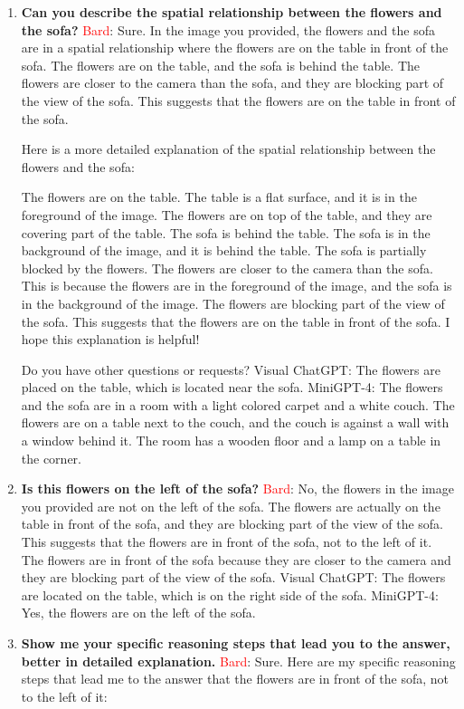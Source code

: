 \begin{enumerate}
    \item \textbf{Can you describe the spatial relationship between the flowers and the sofa?}
    \subitem \textcolor{Red}{Bard}: 
    Sure. In the image you provided, the flowers and the sofa are in a spatial relationship where the flowers are on the table in front of the sofa. The flowers are on the table, and the sofa is behind the table. The flowers are closer to the camera than the sofa, and they are blocking part of the view of the sofa. This suggests that the flowers are on the table in front of the sofa.
    
    Here is a more detailed explanation of the spatial relationship between the flowers and the sofa:
    
    The flowers are on the table. The table is a flat surface, and it is in the foreground of the image. The flowers are on top of the table, and they are covering part of the table.
    The sofa is behind the table. The sofa is in the background of the image, and it is behind the table. The sofa is partially blocked by the flowers.
    The flowers are closer to the camera than the sofa. This is because the flowers are in the foreground of the image, and the sofa is in the background of the image.
    The flowers are blocking part of the view of the sofa. This suggests that the flowers are on the table in front of the sofa.
    I hope this explanation is helpful!
    
    Do you have other questions or requests?
    \subitem Visual ChatGPT: The flowers are placed on the table, which is located near the sofa.
    \subitem MiniGPT-4: The flowers and the sofa are in a room with a light colored carpet and a white couch. The flowers are on a table next to the couch, and the couch is against a wall with a window behind it. The room has a wooden floor and a lamp on a table in the corner.
    \item \textbf{Is this flowers on the left of the sofa?}
    \subitem \textcolor{Red}{Bard}: 
    No, the flowers in the image you provided are not on the left of the sofa. The flowers are actually on the table in front of the sofa, and they are blocking part of the view of the sofa. This suggests that the flowers are in front of the sofa, not to the left of it. The flowers are in front of the sofa because they are closer to the camera and they are blocking part of the view of the sofa.
    \subitem Visual ChatGPT: The flowers are located on the table, which is on the right side of the sofa.
    \subitem MiniGPT-4: Yes, the flowers are on the left of the sofa.
    \item \textbf{Show me your specific reasoning steps that lead you to the answer, better in detailed explanation.}
    \subitem \textcolor{Red}{Bard}: 
    Sure. Here are my specific reasoning steps that lead me to the answer that the flowers are in front of the sofa, not to the left of it:
    

\end{enumerate}
